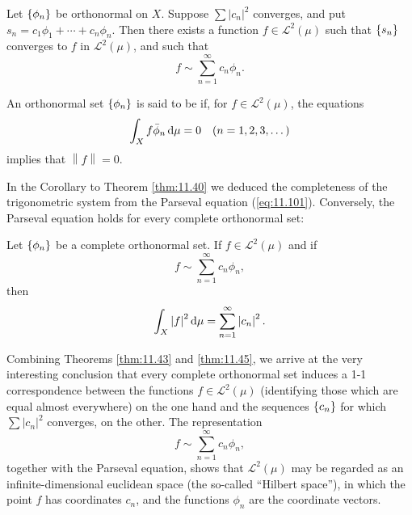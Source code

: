 \begin{thm}
    \label{thm:11.43}
    Let $\protect\{\phi_n\}$ be orthonormal on $X$. 
    Suppose $\sum \left| c_n \right|^2$ converges, 
    and put $s_n = c_1 \phi_1 + \cdots + c_n\phi_n$. 
    Then there exists a function $f \in \mathscr{L}^2(\mu)$
    such that $\protect\{s_n\}$ converges to $f$ in $\mathscr{L}^2(\mu)$, 
    and such that
    \begin{equation*}
        f \sim \sum_{n=1}^{\infty}c_n \phi_n .
    \end{equation*}
\end{thm}

\begin{mydef}
    \label{mydef:11.44}
    An orthonormal set $\protect\{\phi_n\}$ is said to be  if, for $f \in \mathscr{L}^2(\mu)$, the equations
    \begin{equation*}
        \int_X f \bar{\phi}_n \d \mu = 0
        \quad (n = 1,2,3,\dots)
    \end{equation*}
    implies that $\left\| f \right\| = 0$.
\end{mydef}


In the Corollary to Theorem \ref{thm:11.40} 
we deduced the completeness of the
trigonometric system from the Parseval equation (\ref{eq:11.101}). 
Conversely, the Parseval
equation holds for every complete orthonormal set:

\begin{thm}
    \label{thm:11.45}
    Let $\protect\{\phi_n\}$ be a complete orthonormal set. 
    If $f \in \mathscr{L}^2(\mu)$ and if
    \begin{equation}
        \label{eq:11.106}
        f \sim \sum_{n=1}^{\infty} c_n \phi_n,
    \end{equation}
    then 
    \begin{equation}
        \label{eq:11.107}
        \int_X \left| f \right|^2 \d \mu =
        \sum_{n=1}^{\infty} \left| c_n \right|^2 .
    \end{equation}
\end{thm}


Combining Theorems \ref{thm:11.43} and \ref{thm:11.45}, we arrive at the very interesting
conclusion that every complete orthonormal set induces a 1-1 correspondence
between the functions $f \in \mathscr{L}^2(\mu)$ 
(identifying those which are equal almost everywhere)
on the one hand and the sequences $\protect\{c_n\}$ for which $\sum \left| c_n \right|^2$ converges,
on the other. The representation
\begin{equation*}
    f \sim \sum_{n=1}^{\infty} c_n \phi_n ,
\end{equation*}
together with the Parseval equation, shows that $\mathscr{L}^2(\mu)$ may be regarded as an
infinite-dimensional euclidean space (the so-called ``Hilbert space''), in which
the point $f$ has coordinates $c_n$, and the functions $\phi_n$ are the coordinate vectors.